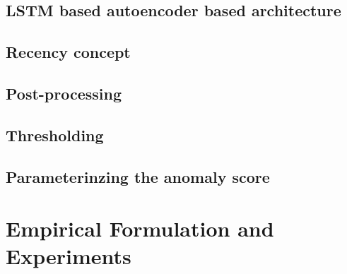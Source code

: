 \documentclass[12pt]{article}
\begin{document}
\subsection{LSTM based autoencoder based architecture}
\subsection{Recency concept}
\subsection{Post-processing}
\subsection{Thresholding}
\subsection{Parameterinzing the anomaly score}
\newpage 
\section{Empirical Formulation and Experiments}
\end{document}
